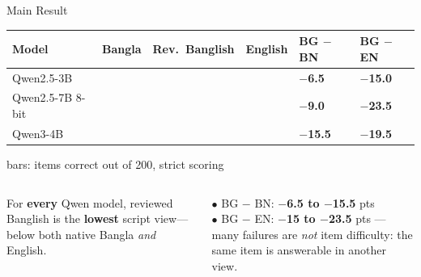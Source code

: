\documentclass[aspectratio=169,10pt]{beamer}
\newcommand{\gp}[1]{\textbf{\color{bad}#1}}     %
\begin{document}

\begin{frame}{Main Result}
\centering
\renewcommand{\arraystretch}{1.45}
\begin{tabular}{L{3.1cm} C{2.0cm} C{2.2cm} C{2.0cm} C{1.6cm} C{1.6cm}}
\toprule
\textbf{Model} & \textbf{\color{cBangla}Bangla} & \textbf{\color{cBanglish}Rev.\ Banglish} & \textbf{\color{cEnglish}English} & \textbf{BG $-$ BN} & \textbf{BG $-$ EN}\\
\midrule
Qwen2.5-3B      &  &  &  & \gp{$-$6.5} & \gp{$-$15.0}\\
Qwen2.5-7B 8-bit &  &  &  & \gp{$-$9.0} & \gp{$-$23.5}\\
Qwen3-4B        &  &  &  & \gp{$-$15.5} & \gp{$-$19.5}\\
\bottomrule
\end{tabular}

{\scriptsize\color{subink} bars: items correct out of 200, strict scoring}
\vspace{0.4cm}

\begin{columns}[T]
\begin{keybox}
\small For \textbf{every} Qwen model, reviewed Banglish is the \textbf{lowest} script view—below both native Bangla \emph{and} English.
\end{keybox}
\footnotesize
$\bullet$ BG $-$ BN: \textbf{$-$6.5 to $-$15.5} pts\\[2pt]
$\bullet$ BG $-$ EN: \textbf{$-$15 to $-$23.5} pts — many failures are \emph{not} item difficulty: the same item is answerable in another view.
\end{columns}
\end{frame}
\end{document}
